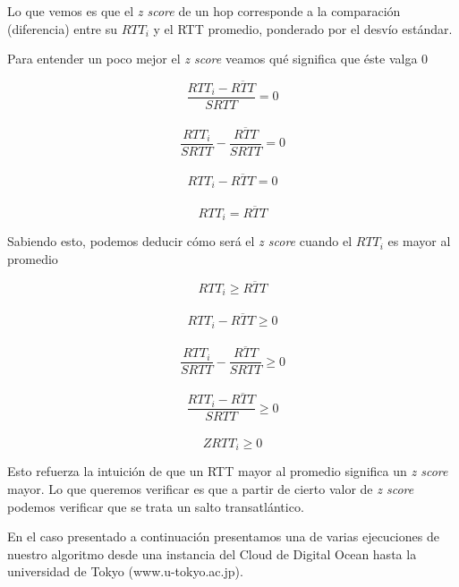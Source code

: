 Lo que vemos es que el \textit{z score} de un hop corresponde a la comparación (diferencia) entre su \textit{$RTT_i$} y el RTT promedio, ponderado por el desvío estándar.

Para entender un poco mejor el \textit{z score} veamos qué significa que éste valga 0

\begin{equation}
	\frac{RTT_i - \overline{RTT}}{SRTT} = 0
\end{equation}
\\
\begin{equation}
	\frac{RTT_i}{SRTT} - \frac{\overline{RTT}}{SRTT} = 0
\end{equation}
\\
\begin{equation}
	RTT_i - \overline{RTT} = 0
\end{equation}
\\
\begin{equation}
	RTT_i = \overline{RTT}
\end{equation}

Sabiendo esto, podemos deducir cómo será el \textit{z score} cuando el \textit{$RTT_i$} es mayor al promedio

\begin{equation}
	RTT_i \geq \overline{RTT}
\end{equation}
\\
\begin{equation}
	RTT_i - \overline{RTT} \geq 0
\end{equation}
\\
\begin{equation}
	\frac{RTT_i}{SRTT} - \frac{\overline{RTT}}{SRTT} \geq 0
\end{equation}
\\
\begin{equation}
	\frac{RTT_i - \overline{RTT}}{SRTT} \geq 0
\end{equation}
\\
\begin{equation}
	ZRTT_i \geq 0
\end{equation}

Esto refuerza la intuición de que un RTT mayor al promedio significa un \textit{z score} mayor. Lo que queremos verificar es que a partir de cierto valor de \textit{z score} podemos verificar que se trata un salto transatlántico.

\clearpage

En el caso presentado a continuación presentamos una de varias ejecuciones de nuestro algoritmo desde una instancia del Cloud de Digital Ocean hasta la universidad de Tokyo (www.u-tokyo.ac.jp).

